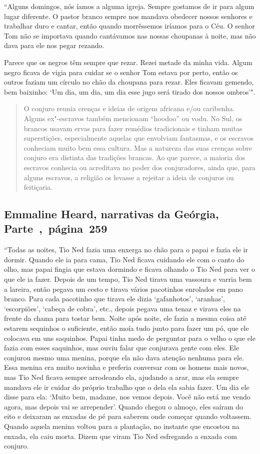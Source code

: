 ``Alguns domingos, nós íamos a alguma igreja. Sempre gostamos de ir para
algum lugar diferente. O pastor branco sempre nos mandava obedecer
nossos senhores e trabalhar duro e cantar, então quando morrêssemos
iríamos para o Céu. O senhor Tom não se importava quando cantávamos nas
nossas choupanas à noite, mas não dava para ele nos pegar rezando.

Parece que os negros têm sempre que rezar. Rezei metade da minha vida.
Algum negro ficava de vigia para cuidar se o senhor Tom estava por
perto, então os outros faziam um círculo no chão da choupana para rezar.
Eles ficavam gemendo, bem baixinho: `Um dia, um dia, um dia esse jugo
será tirado dos nossos ombros'".

\begin{quote}
O conjuro reunia crenças e ideias de origem africana e/ou
caribenha. Alguns ex"-escravos também mencionam ``hoodoo'' ou vodu. No
Sul, os brancos usavam ervas para fazer remédios tradicionais e tinham
muitas superstições, especialmente aquelas que envolviam fantasmas, e os
escravos conheciam muito bem essa cultura. Mas a natureza das suas
crenças sobre conjuro era distinta das tradições brancas. Ao que parece,
a maioria dos escravos conhecia ou acreditava no poder dos conjuradores,
ainda que, para alguns escravos, a religião os levasse a rejeitar a
ideia de conjuros ou feitiçaria.
\end{quote}

\subsection{Emmaline Heard, narrativas da Geórgia, Parte~,~página~259}
\label{ref135}

``Todas as noites, Tio Ned fazia uma enxerga no chão para o papai e
fazia ele ir dormir. Quando ele ia para cama, Tio Ned ficava cuidando
ele com o canto do olho, mas papai fingia que estava dormindo e ficava
olhando o Tio Ned para ver o que ele ia fazer. Depois de um tempo, Tio
Ned tirava uma vassoura e varria bem a lareira, então pegava um cesto e
tirava vários pacotinhos enrolados em pano branco. Para cada pacotinho
que tirava ele dizia `gafanhotos', `aranhas', `escorpiões', `cabeça de
cobra', etc., depois pegava uma tenaz e virava eles na frente da chama
para tostar bem. Noite após noite, ele fazia a mesma coisa até estarem
sequinhos o suficiente, então moía tudo junto para fazer um pó, que ele
colocava em uns saquinhos. Papai tinha medo de perguntar para o velho o
que ele fazia com esses saquinhos, mas ouviu falar que conjurava gente
com eles. Ele conjurou mesmo uma menina, porque ela não dava atenção
nenhuma para ele. Essa menina era muito novinha e preferia conversar com
os homens mais novos, mas Tio Ned ficava sempre arrodeando ela, ajudando
a arar, mas ela sempre mandava ele ir cuidar do próprio trabalho que o
dela ela sabia fazer. Um dia ele disse para ela: `Muito bem, madame, nos
vemos depois. Você não está me vendo agora, mas depois vai se
arrepender'. Quando chegou o almoço, eles saíram do eito e deixaram as
enxadas de pé para saberem onde começar quando voltassem. Quando aquela
menina voltou para a plantação, no instante que encostou na enxada, ela
caiu morta. Dizem que viram Tio Ned esfregando a enxada com conjuro.

